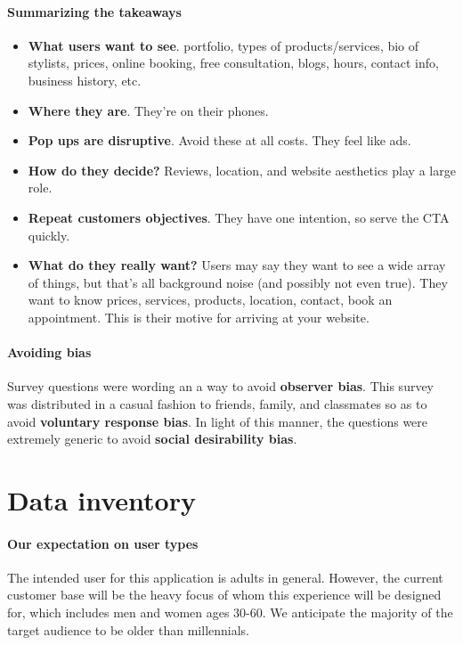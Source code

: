 \paragraph{Summarizing the takeaways}
\begin{itemize}
\item
  \textbf{What users want to see}. portfolio, types of products/services, bio of stylists, prices, online booking, free consultation, blogs, hours, contact info, business history, etc.
\item
  \textbf{Where they are}. They're on their phones.
\item
  \textbf{Pop ups are disruptive}. Avoid these at all costs. They feel like ads.
\item
  \textbf{How do they decide?} Reviews, location, and website aesthetics play a large role.
\item
  \textbf{Repeat customers objectives}. They have one intention, so serve the CTA quickly.
\item
  \textbf{What do they really want?} Users may say they want to see a wide array of things, but that's all background noise (and possibly not even true). They want to know prices, services, products, location, contact, book an appointment. This is their  motive for arriving at your website.
\end{itemize}

\paragraph{Avoiding bias}
Survey questions were wording an a way to avoid \textbf{observer bias}. This survey was distributed in a casual fashion to friends, family, and classmates so as to avoid \textbf{voluntary response bias}. In light of this manner, the questions were extremely generic to avoid \textbf{social desirability bias}.


\section{Data inventory}

\paragraph{Our expectation on user types}
The intended user for this application is adults in general. However, the current customer base will be the heavy focus of whom this experience will be designed for, which includes men and women ages 30-60. We anticipate the majority of the target audience to be older than millennials.

